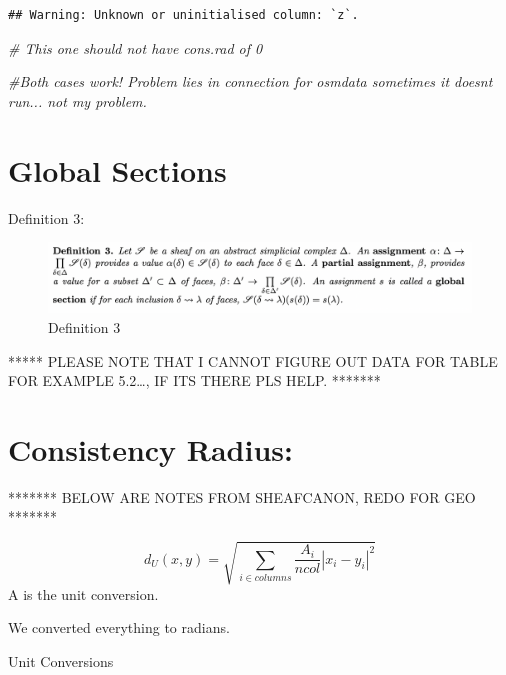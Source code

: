 \documentclass[
]{article}
\newenvironment{Shaded}{\begin{snugshade}}{\end{snugshade}}
\newcommand{\CommentTok}[1]{\textcolor[rgb]{0.56,0.35,0.01}{\textit{#1}}}
\begin{document}
\begin{verbatim}
## Warning: Unknown or uninitialised column: `z`.
\end{verbatim}

\begin{Shaded}
\begin{Highlighting}[]
\CommentTok{\# This one should not have cons.rad of 0}

\CommentTok{\#Both cases work! Problem lies in connection for osmdata sometimes it doesnt run... not my problem.}
\end{Highlighting}
\end{Shaded}

\hypertarget{global-sections}{%
\section{Global Sections}\label{global-sections}}

Definition 3:

\begin{figure}
\centering
\includegraphics{GeoDef3.png}
\caption{Definition 3}
\end{figure}

***** PLEASE NOTE THAT I CANNOT FIGURE OUT DATA FOR TABLE FOR EXAMPLE
5.2\ldots, IF ITS THERE PLS HELP. *******

\hypertarget{consistency-radius}{%
\section{Consistency Radius:}\label{consistency-radius}}

******* BELOW ARE NOTES FROM SHEAFCANON, REDO FOR GEO *******

\[d_U(x,y) = \sqrt{\sum_{i \in columns} \frac{A_i}{ncol} | x_i - y_i| ^2}\]
A is the unit conversion.

We converted everything to radians.

Unit Conversions
\end{document}
